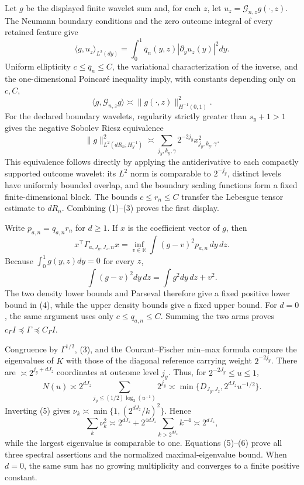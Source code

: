 Let \(g\) be the displayed finite wavelet sum and, for each \(z\), let \(u_z=\mathcal G_{n,z}g(\cdot,z)\).  The Neumann boundary conditions and the zero outcome integral of every retained feature give
\[
 \langle g,u_z\rangle_{L^2(dy)}
 =\int_0^1\bar q_n(y,z)|\partial_yu_z(y)|^2dy.          \tag{1}
\]
Uniform ellipticity \(c\le\bar q_n\le C\), the variational characterization of the inverse, and the one-dimensional Poincar\'e inequality imply, with constants depending only on \(c,C\),
\[
 \langle g,\mathcal G_{n,z}g\rangle
 \asymp \|g(\cdot,z)\|_{H^{-1}(0,1)}^2.               \tag{2}
\]
For the declared boundary wavelets, regularity strictly greater than \(s_y+1>1\) gives the negative Sobolev Riesz equivalence
\[
 \|g\|_{L^2(dR_n;H^{-1}_y)}^2
 \asymp\sum_{j_y,k_y,\gamma}2^{-2j_y}x_{j_y,k_y,\gamma}^2. \tag{3}
\]
This equivalence follows directly by applying the antiderivative to each compactly supported outcome wavelet: its \(L^2\) norm is comparable to \(2^{-j_y}\), distinct levels have uniformly bounded overlap, and the boundary scaling functions form a fixed finite-dimensional block.  The bounds \(c\le r_n\le C\) transfer the Lebesgue tensor estimate to \(dR_n\).  Combining (1)--(3) proves the first display.

Write \(p_{a,n}=q_{a,n}r_n\) for \(d\ge1\).  If \(x\) is the coefficient vector of \(g\), then
\[
 x^\top\Gamma_{a,J_y,J_z,n}x
 =\inf_{v\in\mathbb R}\int(g-v)^2p_{a,n}\,dy\,dz.       \tag{4}
\]
Because \(\int_0^1g(y,z)dy=0\) for every \(z\),
\[
 \int(g-v)^2dy\,dz=\int g^2dy\,dz+v^2.
\]
The two density lower bounds and Parseval therefore give a fixed positive lower bound in (4), while the upper density bounds give a fixed upper bound.  For \(d=0\), the same argument uses only \(c\le q_{a,n}\le C\).  Summing the two arms proves \(c_\Gamma I\preceq\Gamma\preceq C_\Gamma I\).

Congruence by \(\Gamma^{1/2}\), (3), and the Courant--Fischer min--max formula compare the eigenvalues of \(K\) with those of the diagonal reference carrying weight \(2^{-2j_y}\).  There are \(\asymp2^{j_y+dJ_z}\) coordinates at outcome level \(j_y\).  Thus, for \(2^{-2J_y}\le u\le1\),
\[
 N(u)\asymp 2^{dJ_z}\sum_{j_y\le(1/2)\log_2(u^{-1})}2^{j_y}
 \asymp\min\{D_{J_y,J_z},2^{dJ_z}u^{-1/2}\}.           \tag{5}
\]
Inverting (5) gives \(\nu_k\asymp\min\{1,(2^{dJ_z}/k)^2\}\).  Hence
\[
 \sum_k\nu_k^2\asymp
 2^{dJ_z}+2^{4dJ_z}\sum_{k>2^{dJ_z}}k^{-4}
 \asymp2^{dJ_z},                                       \tag{6}
\]
while the largest eigenvalue is comparable to one.  Equations (5)--(6) prove all three spectral assertions and the normalized maximal-eigenvalue bound.  When \(d=0\), the same sum has no growing multiplicity and converges to a finite positive constant.

